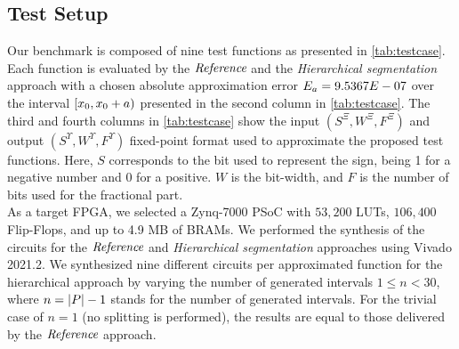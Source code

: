 \subsection{Test Setup}
{Our} benchmark {is} composed of {nine} test functions {as} presented in \cref{tab:testcase}.
Each function is evaluated by the $\textit{Reference}$ and {the \textit{Hierarchical segmentation} approach} with {a chosen} absolute approximation error $E_a=9.5367E-07$ over the interval $[x_{0},x_{0}+a)$ presented in the second column in \cref{tab:testcase}.
The third and fourth columns in \cref{tab:testcase} show the input {$(S^{\Xi},W^{\Xi},F^{\Xi})$} and output {$(S^\Upsilon,W^\Upsilon,F^\Upsilon)$} fixed-point format used to approximate the proposed test functions.
Here, $S$ corresponds to the bit used to represent the sign, being 1 for a negative number and 0 for a positive.
{$W$} is the bit-width, and {$F$} is the number of bits used for the fractional part.\\
As a target \ac{FPGA}, we selected {a} Zynq-7000 \ac{PSoC} with $53,200$ \acp{LUT}, $106,400$ Flip-Flops, and up to 4.9 MB of \acp{BRAM}.
We performed the synthesis of the circuits for the $\textit{Reference}$ and {\textit{Hierarchical segmentation}} approaches using Vivado 2021.2.
We synthesized {nine} {different circuits} per approximated function for the hierarchical approach by varying the number of generated intervals $1\leq n < 30$, where {$n=|P|-1$} stands for the number of generated intervals. 
For the trivial case of $n=1$ (no splitting is performed), the results are equal to those delivered by the $\textit{Reference}$ {approach}.
